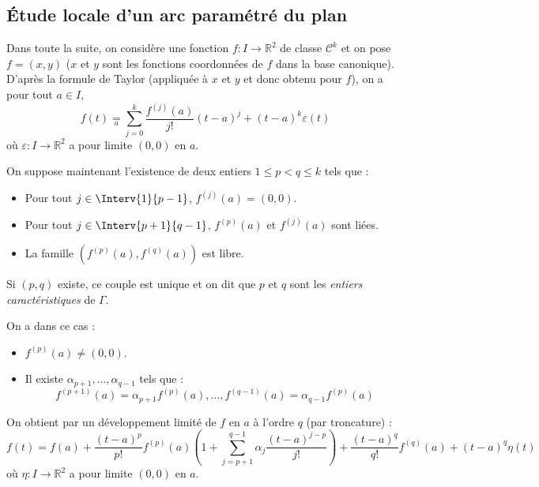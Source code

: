 \documentclass[a4paper,10pt]{report}
\begin{document}

\subsection{Étude locale d'un arc paramétré du plan}
\noindent Dans toute la suite, on considère une fonction $f : I \rightarrow \mathbb{R}^2$ de classe $\mathcal{C}^k$ et on pose $f=(x,y)$ ($x$ et $y$ sont les fonctions coordonnées de $f$ dans la base canonique). D'après la formule de Taylor (appliquée à $x$ et $y$ et donc obtenu pour $f$), on a pour tout $a \in I$,
$$ f(t)  \underset{a}{=} \sum_{j=0}^k \dfrac{f^{(j)}(a)}{j!} (t-a)^j+ (t-a)^k \varepsilon(t)$$
où $\varepsilon : I \rightarrow \mathbb{R}^2$ a pour limite $(0,0)$ en $a$.

\medskip

\noindent On suppose maintenant l'existence de deux entiers $1 \leq p <q \leq k$ tels que :
\begin{itemize}
\item Pour tout $j \in \Interv{1}{p-1}$, $f^{(j)}(a)=(0,0)$.
\item Pour tout $j \in \Interv{p+1}{q-1}$, $f^{(p)}(a)$ et $f^{(j)}(a)$ sont liées.
\item La famille $(f^{(p)}(a), f^{(q)}(a))$ est libre.
\end{itemize}

\medskip

\noindent Si $(p,q)$ existe, ce couple est unique et on dit que $p$ et $q$ sont les \textit{entiers caractéristiques} de $\Gamma$. 

\medskip

\noindent On a dans ce cas :

\begin{itemize}
\item $f^{(p)}(a) \neq (0,0)$.
\item Il existe $\alpha_{p+1}, \ldots, \alpha_{q-1}$ tels que :
$$ f^{(p+1)}(a) = \alpha_{p+1} f^{(p)}(a), \ldots,  f^{(q-1)}(a)= \alpha_{q-1} f^{(p)}(a)$$
\end{itemize}
On obtient par un développement limité de $f$ en $a$ à l'ordre $q$ (par troncature) : 
$$ f(t) =  f(a) + \dfrac{(t-a)^p}{p!} f^{(p)}(a) \left( 1 + \sum_{j=p+1}^{q-1} \alpha_j \dfrac{(t-a)^{j-p}}{j!} \right) + \dfrac{(t-a)^q}{q!} f^{(q)}(a) + (t-a)^q \eta(t)$$
où $\eta : I \rightarrow \mathbb{R}^2$ a pour limite $(0,0)$ en $a$.
\end{document}
